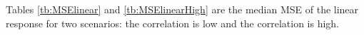 \documentclass[a4paper]{article} 	%
\newcommand{\Matern}{Mat\'ern }
\newcommand{\zc}[1]{\textcolor{blue}{#1}}
\begin{document}
Tables \ref{tb:MSElinear} and \ref{tb:MSElinearHigh} are the median MSE of the linear response for two scenarios: the correlation is low and the correlation is high.

\end{document}
